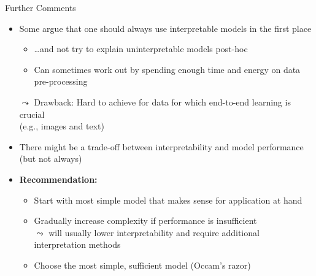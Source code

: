 \documentclass[11pt,compress,t,notes=noshow, aspectratio=169, xcolor=table]{beamer}
\begin{document}
\begin{frame}{Further Comments}

    \begin{itemize}
    \itemsep1em
        \item Some argue that one should always use interpretable models in the first place 
        \begin{itemize}
            \item \ldots and not try to explain uninterpretable models post-hoc
            \item Can sometimes work out by spending enough time and energy on data pre-processing %
        \end{itemize}
       \item[$\leadsto$] Drawback: Hard to achieve for data for which end-to-end learning is crucial\\ (e.g., images and text)
        \item There might be a trade-off between interpretability and model performance (but not always)
        \pause
        \item \textbf{Recommendation:}
        \begin{itemize}
            \item Start with most simple model that makes sense for application at hand
            \item Gradually increase complexity if performance is insufficient\\
            $\leadsto$ will usually lower interpretability and require additional interpretation methods
            \item Choose the most simple, sufficient model (Occam's razor)
        \end{itemize} 
    \end{itemize}

\end{frame}


\endlecture
\end{document}
